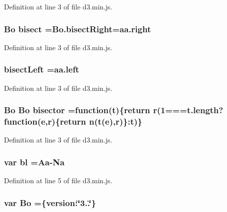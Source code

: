 Definition at line 3 of file d3.\+min.\+js.

\subsubsection[{bisect}]{ {\bf Bo} bisect =Bo.\+bisect\+Right=aa.\+right}\label{d3_8min_8js_a5bedd666f42d774018a092bfaafd412f}


Definition at line 3 of file d3.\+min.\+js.

\subsubsection[{bisect\+Left}]{ bisect\+Left =aa.\+left}\label{d3_8min_8js_a79c0d652a4bb92caf1853c0b5439a6f1}


Definition at line 3 of file d3.\+min.\+js.

\subsubsection[{bisector}]{ {\bf Bo} {\bf Bo} bisector =function(t)\{{\bf return} {\bf r}(1===t.\+length?function({\bf e},{\bf r})\{{\bf return} {\bf n}(t({\bf e}),{\bf r})\}\+:t)\}}\label{d3_8min_8js_a193554561153b2f04e07a6cd78bdc6d1}


Definition at line 3 of file d3.\+min.\+js.

\subsubsection[{bl}]{\setlength{\rightskip}{0pt plus 5cm}var bl ={\bf Aa}-\/{\bf Na}}\label{d3_8min_8js_a05358a0556657246c604da53d5cf5224}


Definition at line 5 of file d3.\+min.\+js.

\subsubsection[{Bo}]{\setlength{\rightskip}{0pt plus 5cm}var Bo =\{version\+:\char`\"{}3..\char`\"{}\}}\label{d3_8min_8js_ade131ecef54535916db8b94360e26d3c}


